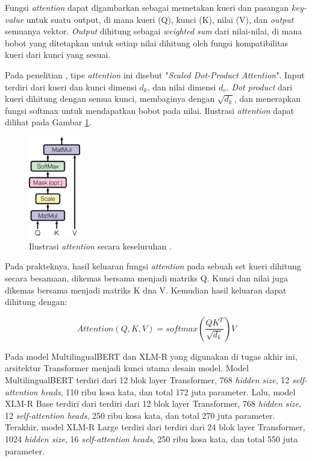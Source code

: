     Fungsi \textit{attention} dapat digambarkan sebagai memetakan kueri dan pasangan \textit{key-value} untuk suatu output, di mana kueri (Q), kunci (K), nilai (V), dan \textit{output} semuanya vektor. \textit{Output} dihitung sebagai \textit{weighted sum} dari nilai-nilai, di mana bobot yang ditetapkan untuk setiap nilai dihitung oleh fungsi kompatibilitas kueri dari kunci yang sesuai.

    Pada penelitian \parencite{AttentionVaswani2017}, tipe \textit{attention} ini disebut "\textit{Scaled Dot-Product Attention}". Input terdiri dari kueri dan kunci dimensi \(d_{k}\), dan nilai dimensi \(d_{v}\). \textit{Dot product} dari kueri dihitung dengan semua kunci, membaginya dengan \(\sqrt{d_{k}}\), dan menerapkan fungsi softmax untuk mendapatkan bobot pada nilai. Ilustrasi \textit{attention} dapat dilihat pada Gambar \ref{fig:ilustrasi_attention}.

    \begin{figure}[ht]
        \centering
        \includegraphics[width=0.2\textwidth]{resources/overview-attention.png}
        \caption{Ilustrasi \textit{attention} secara keseluruhan \parencite{AttentionVaswani2017}.}
        \label{fig:ilustrasi_attention}
    \end{figure}

    Pada prakteknya, hasil keluaran fungsi \textit{attention} pada sebuah set kueri dihitung secara besamaan, dikemas bersama menjadi matriks Q. Kunci dan nilai juga dikemas bersama menjadi matriks K dna V. Kemudian hasil keluaran dapat dihitung dengan:

    \begin{equation}
        Attention(Q,K,V) = softmax(\frac{QK^{T}}{\sqrt{d_k}})V
    \end{equation}

    Pada model MultilingualBERT dan XLM-R yang digunakan di tugas akhir ini, arsitektur Transformer menjadi kunci utama desain model. Model MultilingualBERT terdiri dari 12 blok layer Transformer, 768 \textit{hidden size}, 12 \textit{self-attention heads}, 110 ribu kosa kata, dan total 172 juta parameter. Lalu, model XLM-R Base terdiri dari terdiri dari 12 blok layer Transformer, 768 \textit{hidden size}, 12 \textit{self-attention heads}, 250 ribu kosa kata, dan total 270 juta parameter. Terakhir, model XLM-R Large terdiri dari terdiri dari 24 blok layer Transformer, 1024 \textit{hidden size}, 16 \textit{self-attention heads}, 250 ribu kosa kata, dan total 550 juta parameter.


